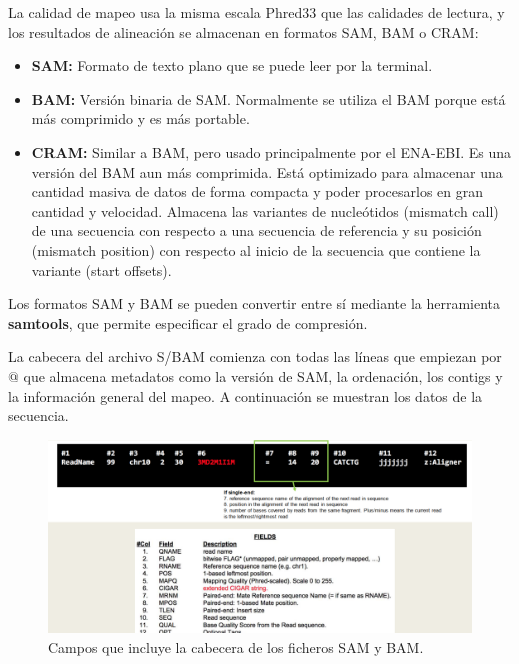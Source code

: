 La calidad de mapeo usa la misma escala Phred33 que las calidades de lectura, y los resultados de alineación se almacenan en formatos SAM, BAM o CRAM:
\begin{itemize}
\item \textbf{SAM:} Formato de texto plano que se puede leer por la terminal.
\item \textbf{BAM:} Versión binaria de SAM. Normalmente se utiliza el BAM porque está más comprimido y es más portable.
\item \textbf{CRAM:} Similar a BAM, pero usado principalmente por el ENA-EBI. Es una versión del BAM aun más comprimida. Está optimizado para almacenar una cantidad masiva de datos de forma compacta y poder procesarlos en gran cantidad y velocidad. Almacena las variantes de nucleótidos (mismatch call) de una secuencia con respecto a una secuencia de referencia y su posición (mismatch position) con respecto al inicio de la secuencia que contiene la variante (start offsets).
\end{itemize}

Los formatos SAM y BAM se pueden convertir entre sí mediante la herramienta \textbf{samtools}, que permite especificar el grado de compresión.

La cabecera del archivo S/BAM comienza con todas las líneas que empiezan por $@$ que almacena metadatos como la versión de SAM, la ordenación, los contigs y la información general del mapeo. A continuación se muestran los datos de la secuencia.
\begin{figure}
\centering
\includegraphics[width = \textwidth]{figs/sam-header.png}
\caption{Campos que incluye la cabecera de los ficheros SAM y BAM.}
\end{figure}

